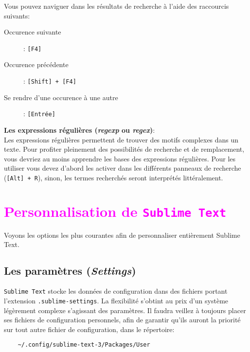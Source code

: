 \documentclass[french,a4paper]{article}
\begin{document}
Vous pouvez naviguer dans les résultats de recherche à l'aide des raccourcis
suivants:
\begin{description}
	\item[Occurence suivante]: \texttt{[F4]}
	\item[Occurence précédente]: \texttt{[Shift] + [F4]}
	\item[Se rendre d'une occurence à une autre]: \texttt{[Entrée]}
\end{description}
\bigskip

\textbf{Les expressions régulières (\textit{regexp} ou \textit{regex})}:\\
Les expressions régulières permettent de trouver des motifs complexes dans un
 texte. Pour profiter pleinement des possibilités de recherche et de 
 remplacement, vous devriez au moins apprendre les bases des expressions 
 régulières. Pour les utiliser vous devez d'abord les activer dans les 
 différents panneaux de recherche (\texttt{[Alt] + R}), sinon, les termes 
 recherchés seront interprétés littéralement.
\bigskip

\section{\textcolor{magenta}{Personnalisation de \texttt{Sublime Text}}}
Voyons les options les plus courantes afin de personnaliser entièrement Sublime
 Text.
\bigskip

\subsection*{Les paramètres (\textit{Settings})}
\texttt{Sublime Text} stocke les données de configuration dans des fichiers 
 portant l'extension \texttt{.sublime-settings}. La flexibilité s'obtint au
 prix d'un système légèrement complexe s'agissant des paramètres. Il faudra
 veillez à toujours placer ses fichiers de configuration personnels, afin de
 garantir qu'ils auront la priorité sur tout autre fichier de configuration,
 dans le répertoire:
\begin{verbatim}
    ~/.config/sublime-text-3/Packages/User
\end{verbatim}
\medskip
\end{document}

